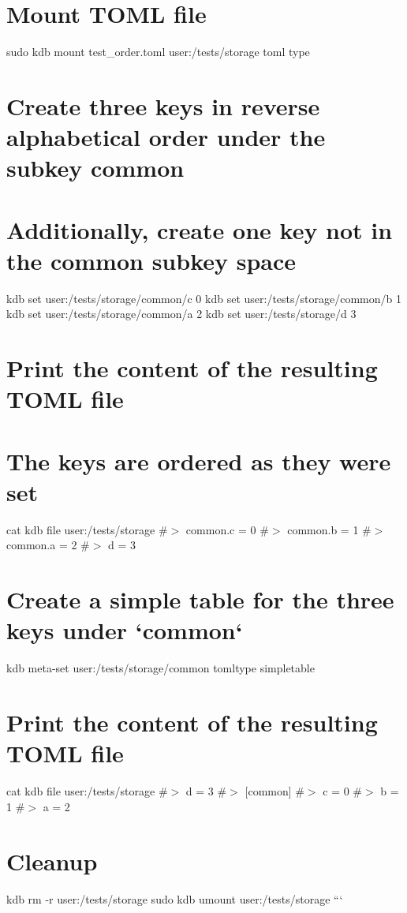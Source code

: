  \hypertarget{autotoc_md635_autotoc_md733}{}\section{Mount T\+O\+M\+L file}\label{autotoc_md635_autotoc_md733}
sudo kdb mount test\+\_\+order.\+toml user\+:/tests/storage toml type\hypertarget{autotoc_md635_autotoc_md734}{}\section{Create three keys in reverse alphabetical order under the subkey common}\label{autotoc_md635_autotoc_md734}
\hypertarget{autotoc_md635_autotoc_md735}{}\section{Additionally, create one key not in the common subkey space}\label{autotoc_md635_autotoc_md735}
kdb set \textquotesingle{}user\+:/tests/storage/common/c\textquotesingle{} \textquotesingle{}0\textquotesingle{} kdb set \textquotesingle{}user\+:/tests/storage/common/b\textquotesingle{} \textquotesingle{}1\textquotesingle{} kdb set \textquotesingle{}user\+:/tests/storage/common/a\textquotesingle{} \textquotesingle{}2\textquotesingle{} kdb set \textquotesingle{}user\+:/tests/storage/d\textquotesingle{} \textquotesingle{}3\textquotesingle{}\hypertarget{autotoc_md635_autotoc_md736}{}\section{Print the content of the resulting T\+O\+M\+L file}\label{autotoc_md635_autotoc_md736}
\hypertarget{autotoc_md635_autotoc_md737}{}\section{The keys are ordered as they were set}\label{autotoc_md635_autotoc_md737}
cat {\ttfamily kdb file user\+:/tests/storage} \#$>$ common.\+c = 0 \#$>$ common.\+b = 1 \#$>$ common.\+a = 2 \#$>$ d = 3\hypertarget{autotoc_md635_autotoc_md738}{}\section{Create a simple table for the three keys under `common`}\label{autotoc_md635_autotoc_md738}
kdb meta-\/set \textquotesingle{}user\+:/tests/storage/common\textquotesingle{} \textquotesingle{}tomltype\textquotesingle{} \textquotesingle{}simpletable\textquotesingle{}\hypertarget{autotoc_md635_autotoc_md739}{}\section{Print the content of the resulting T\+O\+M\+L file}\label{autotoc_md635_autotoc_md739}
cat {\ttfamily kdb file user\+:/tests/storage} \#$>$ d = 3 \#$>$ \mbox{[}common\mbox{]} \#$>$ c = 0 \#$>$ b = 1 \#$>$ a = 2\hypertarget{autotoc_md635_autotoc_md740}{}\section{Cleanup}\label{autotoc_md635_autotoc_md740}
kdb rm -\/r user\+:/tests/storage sudo kdb umount user\+:/tests/storage ```


